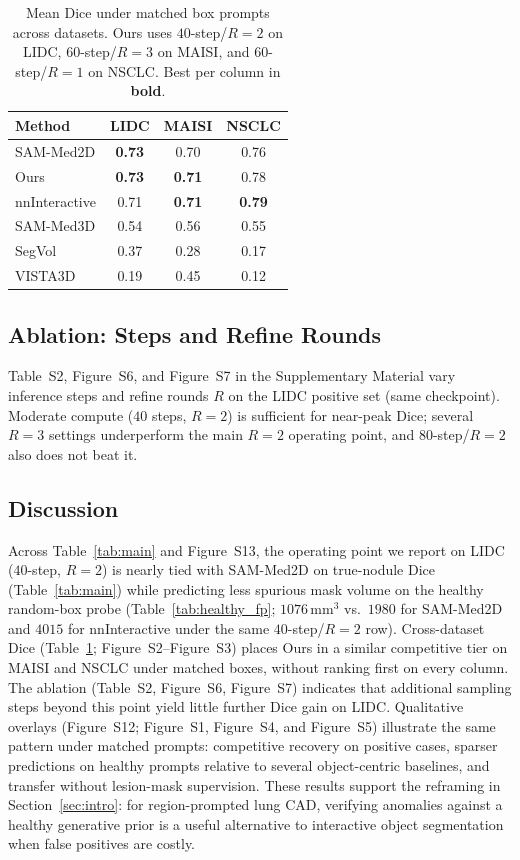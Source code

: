 \documentclass[twoside]{article}
\newcommand{\suppFigQualFP}{Figure~S1}
\newcommand{\suppFigBench}{Figure~S2}
\newcommand{\suppFigBenchPer}{Figure~S3}
\newcommand{\suppFigQualCross}{Figure~S4}
\newcommand{\suppFigQualNSCLC}{Figure~S5}
\newcommand{\suppTabAblation}{Table~S2}
\newcommand{\suppFigAblation}{Figure~S6}
\newcommand{\suppFigQualAblation}{Figure~S7}
\newcommand{\suppFigQualLIDC}{Figure~S12}
\newcommand{\suppFigFPTradeoff}{Figure~S13}
\begin{document}
\begin{table}[t]
\centering
\caption{Mean Dice under matched box prompts across datasets.
Ours uses \(40\)-step/\(R{=}2\) on LIDC, \(60\)-step/\(R{=}3\) on
MAISI, and \(60\)-step/\(R{=}1\) on NSCLC. Best per column in
\textbf{bold}.}
\label{tab:cross}
\begin{tabular}{lccc}
\toprule
Method & LIDC & MAISI & NSCLC \\
\midrule
SAM-Med2D     & \textbf{0.73} & 0.70 & 0.76 \\
Ours          & \textbf{0.73} & \textbf{0.71} & 0.78 \\
nnInteractive & 0.71 & \textbf{0.71} & \textbf{0.79} \\
SAM-Med3D     & 0.54 & 0.56 & 0.55 \\
SegVol        & 0.37 & 0.28 & 0.17 \\
VISTA3D       & 0.19 & 0.45 & 0.12 \\
\bottomrule
\end{tabular}
\end{table}

\subsection{Ablation: Steps and Refine Rounds}
\suppTabAblation{}, \suppFigAblation{}, and \suppFigQualAblation{} in
the Supplementary Material vary inference steps and refine rounds \(R\)
on the LIDC positive set (same checkpoint). Moderate compute
(\(40\) steps, \(R{=}2\)) is sufficient for near-peak Dice; several
\(R{=}3\) settings underperform the main \(R{=}2\) operating point, and
\(80\)-step/\(R{=}2\) also does not beat it.

\subsection{Discussion}
Across Table~\ref{tab:main} and
\suppFigFPTradeoff{}, the operating point we
report on LIDC (\(40\)-step, \(R{=}2\)) is nearly tied with SAM-Med2D on
true-nodule Dice (Table~\ref{tab:main}) while predicting less spurious mask
volume on the healthy random-box probe
(Table~\ref{tab:healthy_fp}; \(1076\,\mathrm{mm}^3\) vs.\ \(1980\) for
SAM-Med2D and \(4015\) for nnInteractive under the same \(40\)-step/\(R{=}2\)
row). Cross-dataset Dice
(Table~\ref{tab:cross}; \suppFigBench{}--\suppFigBenchPer{})
places Ours in a similar competitive tier on MAISI and NSCLC under matched
boxes, without ranking first on every column. The ablation
(\suppTabAblation{}, \suppFigAblation{}, \suppFigQualAblation{})
indicates that additional sampling steps beyond this point yield little
further Dice gain on LIDC. Qualitative overlays
(\suppFigQualLIDC{}; \suppFigQualFP{}, \suppFigQualCross{}, and
\suppFigQualNSCLC{}) illustrate the same pattern under matched
prompts: competitive recovery on positive cases, sparser predictions on
healthy prompts relative to several object-centric baselines, and transfer
without lesion-mask supervision. These results support the reframing in
Section~\ref{sec:intro}: for region-prompted lung CAD, verifying anomalies
against a healthy generative prior is a useful alternative to interactive
object segmentation when false positives are costly.
\end{document}
